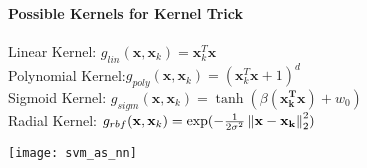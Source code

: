 \begin{sectionbox}
	\paragraph{Possible Kernels for Kernel Trick}
	Linear Kernel: $g_{lin}(\mathbf{x},\mathbf{x}_k)=\mathbf{x}_k^T\mathbf{x}$\\
	Polynomial Kernel:$g_{poly}(\mathbf{x},\mathbf{x}_k)=(\mathbf{x}_k^T\mathbf{x}+1)^d$\\
	Sigmoid Kernel: $g_{sigm}(\mathbf{x},\mathbf{x}_k)=\tanh(\beta(\mathbf{x_k^Tx})+w_0)$ \\
	Radial Kernel: $g_{rbf}(\mathbf{x},\mathbf{x}_k)=\exp(-\frac{1}{2\sigma^2}\left\|\mathbf{x-x_k}\right\|_2^2)$

 \texttt{[image: svm\_as\_nn]}
\end{sectionbox}	